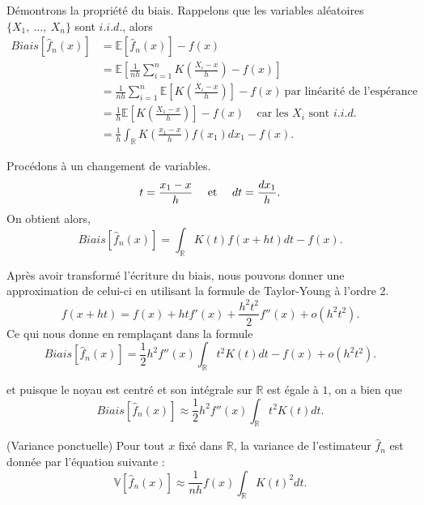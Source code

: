 \documentclass[
]{book}
\begin{document}
\begin{demo}
Démontrons la propriété du biais.
Rappelons que les variables aléatoires $\{ X_1,~\dots, ~X_n\}$ sont $i.i.d.$, alors
$$
\begin{aligned}
Biais  \left[ \hat f_n(x) \right] &= \mathbb E \left[ \hat f_n(x) \right] - f(x) \\
&= \mathbb E \left[ \frac1{nh} \sum\limits_{i=1}^n K\left(\frac{X_i-x}h\right) - f(x) \right] \\
&= \frac1{nh} \sum\limits_{i=1}^n \mathbb E \left[  K\left(\frac{X_i-x}h\right) \right] - f(x) ~\text{par linéarité de l'espérance} \\
&= \frac1{h} \mathbb E \left[  K\left(\frac{X_1-x}h\right) \right] - f(x) ~~~~~\text{car les } X_i \text{ sont }i.i.d.\\
&= \frac1{h} \int_{\mathbb R}  K\left(\frac{x_1-x}h\right) f(x_1)dx_1 - f(x).
\end{aligned}
$$

Procédons à un changement de variables.
$$t=\frac{x_1-x}h ~~~~\hbox{et}~~~~dt =\frac{dx_1}h.$$
On obtient alors, 
$$
Biais  \left[ \hat f_n(x) \right]
= \int_{\mathbb R}  K(t)  f(x+ht)dt - f(x).
$$

Après avoir transformé l'écriture du biais, nous pouvons donner une approximation de celui-ci en utilisant la formule de Taylor-Young à l'ordre 2.
$$f(x+ht)=f(x)+htf'(x)+\frac{h^2t^2}2 f''(x)+o(h^2t^2).$$
Ce qui nous donne en remplaçant dans la formule
$$
Biais \left[ \hat f_n(x) \right] = \frac12h^2f''(x)\int_{\mathbb R} t^2K(t) dt - f(x) + o(h^2t^2).
$$

et puisque le noyau est centré et son intégrale sur $\mathbb R$ est égale à $1$, on a bien que 
$$Biais \left[ \hat f_n(x) \right] \approx \frac12h^2f''(x)\int_{\mathbb R} t^2K(t) dt.$$

\end{demo}

\begin{propri} (Variance ponctuelle)
Pour tout $x$ fixé dans $\mathbb R$, la variance de l'estimateur $\hat f_n$ est donnée par l'équation suivante : 
$$\mathbb V \left[ \hat f_n(x) \right] \approx \frac1{nh} f(x) \int_{\mathbb R}K(t)^2 dt.$$
\end{propri}
\end{document}
